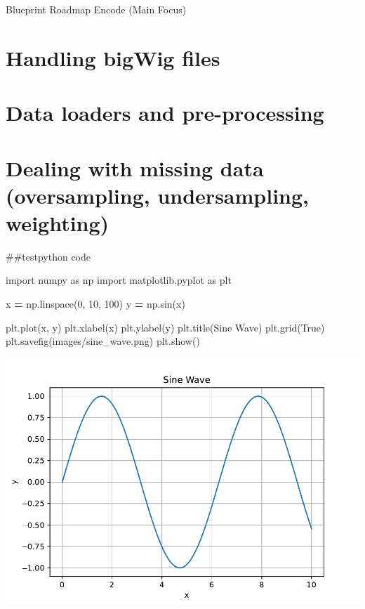 \documentclass[
]{book}
\newenvironment{Shaded}{\begin{snugshade}}{\end{snugshade}}
\newcommand{\DecValTok}[1]{\textcolor[rgb]{0.00,0.00,0.81}{#1}}
\newcommand{\ImportTok}[1]{#1}
\newcommand{\NormalTok}[1]{#1}
\newcommand{\OperatorTok}[1]{\textcolor[rgb]{0.81,0.36,0.00}{\textbf{#1}}}
\newcommand{\StringTok}[1]{\textcolor[rgb]{0.31,0.60,0.02}{#1}}
\newcommand{\VariableTok}[1]{\textcolor[rgb]{0.00,0.00,0.00}{#1}}
\begin{document}
Blueprint
Roadmap
Encode (Main Focus)

\section{Handling bigWig files}\label{handling-bigwig-files}

\section{Data loaders and pre-processing}\label{data-loaders-and-pre-processing}

\section{Dealing with missing data (oversampling, undersampling, weighting)}\label{dealing-with-missing-data-oversampling-undersampling-weighting}

\#\#testpython code

\begin{Shaded}
\begin{Highlighting}[]
\ImportTok{import}\NormalTok{ numpy }\ImportTok{as}\NormalTok{ np}
\ImportTok{import}\NormalTok{ matplotlib.pyplot }\ImportTok{as}\NormalTok{ plt}

\NormalTok{x }\OperatorTok{=}\NormalTok{ np.linspace(}\DecValTok{0}\NormalTok{, }\DecValTok{10}\NormalTok{, }\DecValTok{100}\NormalTok{)}
\NormalTok{y }\OperatorTok{=}\NormalTok{ np.sin(x)}

\NormalTok{plt.plot(x, y)}
\NormalTok{plt.xlabel(}\StringTok{\textquotesingle{}x\textquotesingle{}}\NormalTok{)}
\NormalTok{plt.ylabel(}\StringTok{\textquotesingle{}y\textquotesingle{}}\NormalTok{)}
\NormalTok{plt.title(}\StringTok{\textquotesingle{}Sine Wave\textquotesingle{}}\NormalTok{)}
\NormalTok{plt.grid(}\VariableTok{True}\NormalTok{)}
\NormalTok{plt.savefig(}\StringTok{\textquotesingle{}images/sine\_wave.png\textquotesingle{}}\NormalTok{)}
\NormalTok{plt.show()}
\end{Highlighting}
\end{Shaded}

\includegraphics{_main_files/figure-latex/unnamed-chunk-2-1.pdf}
\end{document}
